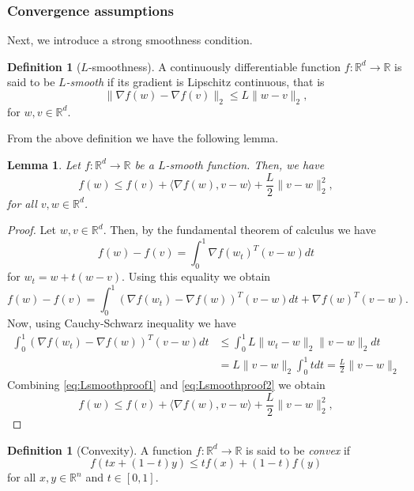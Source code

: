 \documentclass[12pt]{article}
\newtheorem{lemma}[theorem]{Lemma}
\theoremstyle{definition}
\newtheorem{definition}[theorem]{Definition}
\numberwithin{equation}{section}
\newcommand{\norm}[1]{\lVert{#1}\rVert_2}
\begin{document}
\subsubsection{Convergence assumptions}

Next, we introduce a strong smoothness condition.
\begin{definition}[$L$-smoothness]
  \label{def:l_smooth}
  A continuously differentiable function $f : \mathbb{R}^d \rightarrow \mathbb{R}$ is said to be \emph{$L$-smooth} if its gradient is Lipschitz continuous, that is 
  \begin{equation}
    \norm{\nabla f(w) - \nabla f(v) } \leq L \norm{w-v},
  \end{equation}
  for $w,v \in \mathbb{R}^d$.
\end{definition}
From the above definition we have the following lemma.
\begin{lemma}
  Let $f : \mathbb{R}^d \rightarrow \mathbb{R}$ be a $L$-smooth function. Then, we have 
  \begin{equation}
    f(w) \leq f(v) + \langle \nabla f(w), v - w \rangle + \frac{L}{2} \norm{ v - w }^2,
  \end{equation}
  for all $v, w \in \mathbb{R}^d$.
\end{lemma}
\begin{proof}
  Let $w, v \in \mathbb{R}^d$. Then, by the fundamental theorem of calculus we have
  $$
  f(w) - f(v) = \int_0^1 \nabla f(w_t)^T(v-w)dt 
  $$
  for $w_t = w + t(w-v)$.
  Using this equality we obtain
  \begin{equation}
    \label{eq:Lsmoothproof1}
    f(w) - f(v) = \int_0^1 (\nabla f(w_t) - \nabla f(w))^T(v-w)dt + \nabla f(w)^T(v-w).
  \end{equation}
  Now, using Cauchy-Schwarz inequality we have
  \begin{align}
    \label{eq:Lsmoothproof2}
    \int_0^1 (\nabla f(w_t) - \nabla f(w))^T(v-w)dt &\leq \int_0^1 L \norm{w_t-w} \norm{v-w}dt \\
    &= L \norm{v-w} \int_0^1 t dt = \frac{L}{2} \norm{v-w}
  \end{align}
  Combining \ref{eq:Lsmoothproof1} and \ref{eq:Lsmoothproof2} we obtain
  \begin{equation*}
    f(w) \leq f(v) + \langle \nabla f(w), v - w \rangle + \frac{L}{2} \norm{v - w}^2,
  \end{equation*}
\end{proof}
\begin{definition}[Convexity]
  A function $f : \mathbb{R}^d \rightarrow \mathbb{R}$ is said to be \emph{convex} if 
  \begin{equation}
    f(tx+(1-t)y) \leq tf(x)+(1-t)f(y)
  \end{equation}
  for all $x,y \in \mathbb{R}^n$ and $t \in [0,1]$.
\end{definition}
\end{document}
